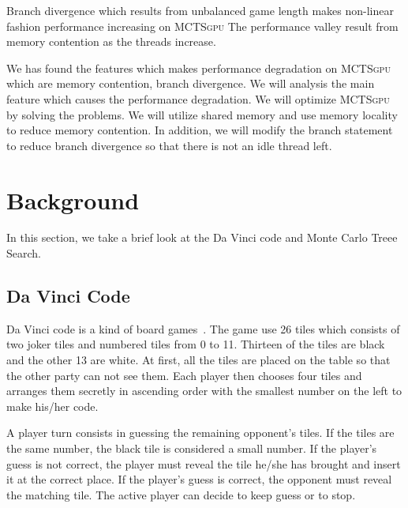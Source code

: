 \documentclass[conference]{IEEEtran}
\newcommand{\gpu} {\textsc{MCTSgpu} }
\begin{document}
Branch divergence which results from unbalanced game length makes non-linear fashion performance increasing on \gpu
The performance valley result from memory contention as the threads increase. 

We has found the features which makes performance degradation on \gpu which are memory contention, branch divergence.
We will analysis the main feature which causes the performance degradation.
We will optimize \gpu by solving the problems.
We will utilize shared memory and use memory locality to reduce memory contention.
In addition, we will modify the branch statement to reduce branch divergence so that there is not an idle thread left.




 
\section{Background}
In this section, we take a brief look at the Da Vinci code and Monte Carlo Treee Search. 
\subsection{Da Vinci Code} \label{sec:davinci}
Da Vinci code is a kind of board games~\cite{davinci_code}. 
The game use 26 tiles which consists of two joker tiles and numbered tiles from 0 to 11. 
Thirteen of the tiles are black and the other 13 are white.
At first, all the tiles are placed on the table so that the other party can not see them.
Each player then chooses four tiles and arranges them secretly in ascending order with the smallest number on the left to make his/her code. 

A player turn consists in guessing the remaining opponent's tiles. 
If the tiles are the same number, the black tile is considered a small number.
If the player's guess is not correct, the player must reveal the tile he/she has brought and insert it at the correct place.
If the player's guess is correct, the opponent must reveal the matching tile.
The active player can decide to keep guess or to stop.
\end{document}
